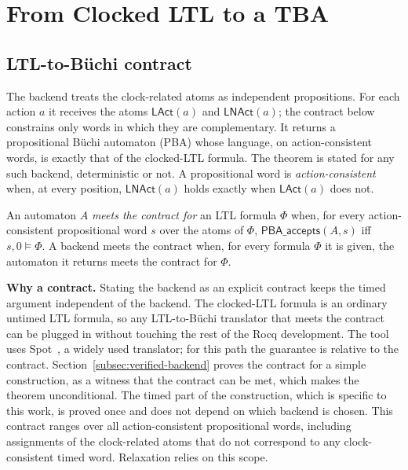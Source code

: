 \documentclass[manuscript]{acmart}
\newcommand{\runinhead}[1]{\par\noindent\textbf{#1}\enspace}
\begin{document}
\section{From Clocked LTL to a TBA}
\label{sec:tba-construction}
\subsection{LTL-to-B\"uchi contract}
The backend treats the clock-related atoms as independent propositions.
For each action $a$ it receives the atoms $\mathsf{LAct}(a)$ and
$\mathsf{LNAct}(a)$; the contract below constrains only words in which they
are complementary. It returns a propositional B\"uchi automaton
(PBA) whose language, on action-consistent words, is exactly that of the clocked-LTL formula. The theorem is
stated for any such backend, deterministic or not. A propositional word is
\emph{action-consistent} when, at every position, $\mathsf{LNAct}(a)$ holds
exactly when $\mathsf{LAct}(a)$ does not.
\begin{assumption}
\label{ass:backend}
An automaton $A$ \emph{meets the contract for} an LTL formula $\Phi$ when, for
every action-consistent propositional word $s$ over the atoms of $\Phi$,
$\mathsf{PBA\_accepts}(A,s)$ iff $s,0\models \Phi$. A backend meets the
contract when, for every formula $\Phi$ it is given, the automaton it returns
meets the contract for $\Phi$.
\end{assumption}
\runinhead{Why a contract.} Stating the backend as an explicit contract keeps the
timed argument independent of the backend. The clocked-LTL formula is an
ordinary untimed LTL formula, so any LTL-to-B\"uchi translator that meets the
contract can be plugged in without touching the rest of the Rocq development.
The tool uses Spot~\cite{spot}, a widely used translator; for this path the guarantee is relative
to the contract. Section~\ref{subsec:verified-backend} proves the contract for a
simple construction, as a witness that the contract can be met, which makes the theorem unconditional. The
timed part of the construction, which is specific to this work, is proved once
and does not depend on which backend is chosen.
This contract ranges over all action-consistent propositional words,
including assignments of the clock-related atoms that do not correspond to any
clock-consistent timed word. Relaxation relies on this scope. 
\end{document}
